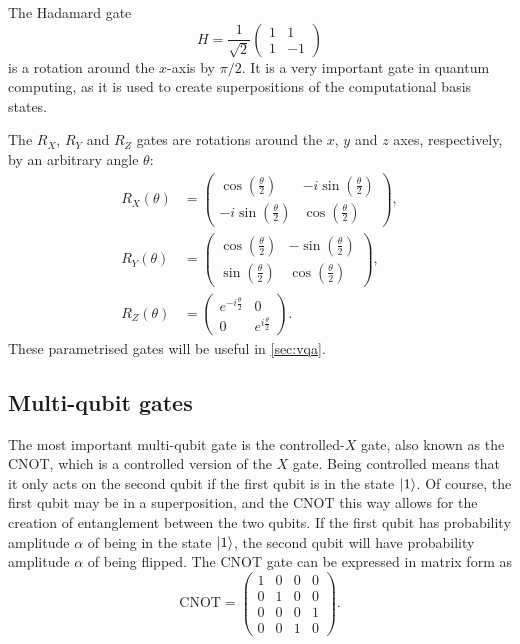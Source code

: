 The Hadamard gate
\begin{equation}
  H = \frac{1}{\sqrt{2}} \begin{pmatrix} 1 & 1 \\ 1 & -1 \end{pmatrix}
\end{equation}
is a rotation around the $x$-axis by $\pi/2$.
It is a very important gate in quantum computing, as it is used to create superpositions of the computational basis states.


The $R_X$, $R_Y$ and $R_Z$ gates are rotations around the $x$, $y$ and $z$ axes, respectively, by an arbitrary angle $\theta$:
\begin{align*}
  R_X(\theta) & = \begin{pmatrix} \cos\left(\frac{\theta}{2}\right) & -i \sin\left(\frac{\theta}{2}\right) \\ -i \sin\left(\frac{\theta}{2}\right) & \cos\left(\frac{\theta}{2}\right) \end{pmatrix}, \\
  R_Y(\theta) & = \begin{pmatrix} \cos\left(\frac{\theta}{2}\right) & -\sin\left(\frac{\theta}{2}\right) \\ \sin\left(\frac{\theta}{2}\right) & \cos\left(\frac{\theta}{2}\right) \end{pmatrix},      \\
  R_Z(\theta) & = \begin{pmatrix} e^{-i\frac{\theta}{2}} & 0 \\ 0 & e^{i\frac{\theta}{2}} \end{pmatrix}.
\end{align*}
These parametrised gates will be useful in \cref{sec:vqa}.

\subsection{Multi-qubit gates}
The most important multi-qubit gate is the controlled-$X$ gate, also known as the CNOT, which is a controlled version of the $X$ gate.
Being controlled means that it only acts on the second qubit if the first qubit is in the state $\ket{1}$.
Of course, the first qubit may be in a superposition, and the CNOT this way allows for the creation of entanglement between the two qubits.
If the first qubit has probability amplitude $\alpha$ of being in the state $\ket{1}$, the second qubit will have probability amplitude $\alpha$ of being flipped.
The CNOT gate can be expressed in matrix form as
\begin{equation}
  \text{CNOT} = \begin{pmatrix} 1 & 0 & 0 & 0 \\ 0 & 1 & 0 & 0 \\ 0 & 0 & 0 & 1 \\ 0 & 0 & 1 & 0 \end{pmatrix}.
\end{equation}

